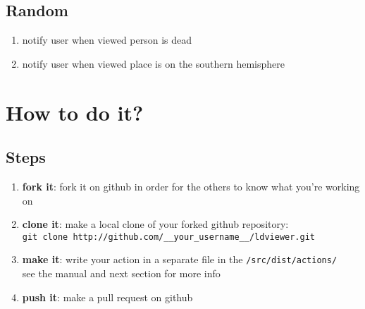 \documentclass{article}
\begin{document}
\subsection{Random}
\begin{enumerate}
\item notify user when viewed person is dead
\item notify user when viewed place is on the southern hemisphere
\end{enumerate}


\section{How to do it?}
\subsection{Steps}
\begin{enumerate}
\item \textbf{fork it}: fork it on github in order for the others to know what you're working on
\item \textbf{clone it}: make a local clone of your forked github repository:\\
\texttt{git clone http://github.com/\_\_your\_username\_\_/ldviewer.git}
\item \textbf{make it}: write your action in a separate file in the \texttt{/src/dist/actions/}\\ see the manual and next section for more info
\item \textbf{push it}: make a pull request on github
\end{enumerate}
\end{document}
